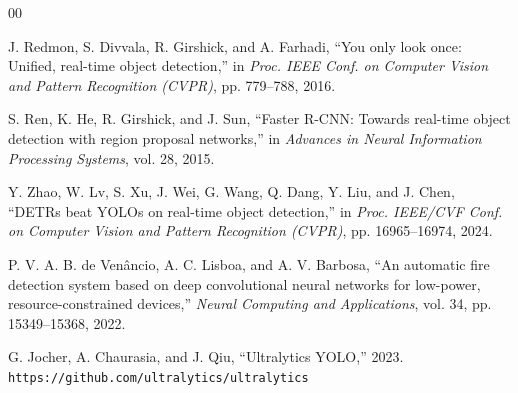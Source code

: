 \documentclass[conference]{IEEEtran}
\begin{document}

\begin{thebibliography}{00}

J. Redmon, S. Divvala, R. Girshick, and A. Farhadi,
``You only look once: Unified, real-time object detection,''
in \textit{Proc. IEEE Conf. on Computer Vision and Pattern Recognition
(CVPR)}, pp. 779--788, 2016.

S. Ren, K. He, R. Girshick, and J. Sun,
``Faster R-CNN: Towards real-time object detection with region proposal
networks,''
in \textit{Advances in Neural Information Processing Systems}, vol. 28,
2015.

Y. Zhao, W. Lv, S. Xu, J. Wei, G. Wang, Q. Dang, Y. Liu, and J. Chen,
``DETRs beat YOLOs on real-time object detection,''
in \textit{Proc. IEEE/CVF Conf. on Computer Vision and Pattern Recognition
(CVPR)}, pp. 16965--16974, 2024.

P. V. A. B. de Venâncio, A. C. Lisboa, and A. V. Barbosa,
``An automatic fire detection system based on deep convolutional neural
networks for low-power, resource-constrained devices,''
\textit{Neural Computing and Applications},
vol. 34, pp. 15349--15368, 2022.

G. Jocher, A. Chaurasia, and J. Qiu,
``Ultralytics YOLO,'' 2023.
\texttt{https://github.com/ultralytics/ultralytics}

\end{thebibliography}
\end{document}
